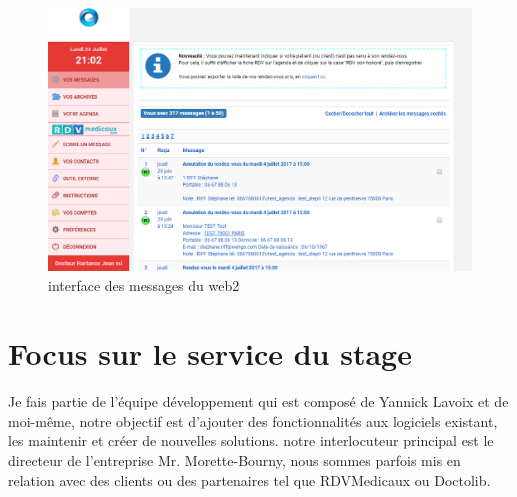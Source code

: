 \begin{figure}[!h]
    \centering
    \includegraphics[width=1\linewidth]{Images/web2messages}
    \caption{interface des messages du web2}
    \label{fig:archhexa}
\end{figure}

\section{Focus sur le service du stage}
Je fais partie de l'équipe développement qui est composé de Yannick Lavoix et de moi-même, 
notre objectif est d'ajouter des fonctionnalités aux logiciels existant, 
les maintenir et créer de nouvelles solutions. notre interlocuteur principal est le directeur
de l'entreprise Mr. Morette-Bourny, nous sommes parfois mis en relation avec des clients 
ou des partenaires tel que RDVMedicaux ou Doctolib. \newline


